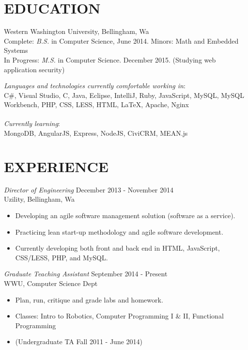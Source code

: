 \documentclass[line,margin]{res}
\begin{document}
\address{835 N State St. Apt 310 Bellingham, WA 98225}
\address{(425) 241-7977 \hspace{13mm} kyle.rader@ieee.org}
 
\begin{resume}
 
\section{EDUCATION}   Western Washington University, Bellingham, Wa\\
			    Complete: {\sl B.S.} in Computer Science, June 2014. Minors: Math and Embedded Systems\\
			    In Progress: {\sl M.S.} in Computer Science. December 2015. (Studying web application security)	  
			          	      
		{\sl Languages and technologies currently comfortable working in}: \\
		C\#, Visual Studio, C, Java, Eclipse, IntelliJ, Ruby, JavaScript, MySQL, MySQL Workbench, PHP, CSS, LESS, HTML, {\LaTeX}, Apache, Nginx \\
		\vspace{-.1cm} \\
		{\sl Currently learning}: \\
		MongoDB, AngularJS, Express, NodeJS, CiviCRM, MEAN.js

\section{EXPERIENCE}

		{\sl Director of Engineering} \hfill December 2013 - November 2014 \\
                	Uzility, Bellingham, Wa
               	 \begin{itemize}  \itemsep -2pt
                		\item Developing an agile software management solution (software as a service).
                		\item Practicing lean start-up methodology and agile software development. 
                		\item Currently developing both front and back end in HTML, JavaScript, CSS/LESS, PHP, and MySQL.
                	\end{itemize}

                	{\sl Graduate Teaching Assistant} \hfill        September 2014 - Present \\
                	WWU, Computer Science Dept
                  	\begin{itemize} \itemsep -2pt
                   		\item Plan, run, critique and grade labs and homework.
			\item Classes: Intro to Robotics, Computer Programming I \& II, Functional Programming
			\item (Undergraduate TA Fall 2011 - June 2014)
                   	\end{itemize}


\end{resume}
\end{document}
